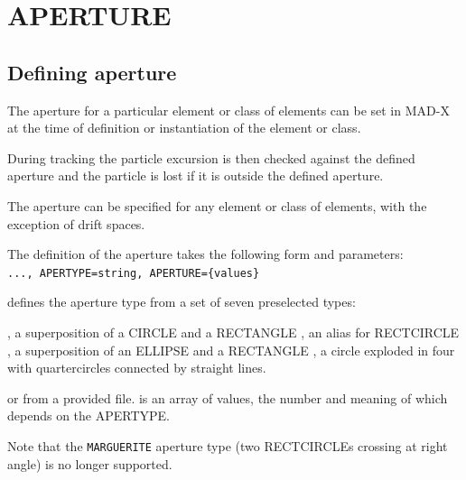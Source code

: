  
\chapter{APERTURE}
\label{chap:aperture}

\section{Defining aperture}
\label{sec:def_aper}
The aperture for a particular element or class of elements can be set in MAD-X 
at the time of definition or instantiation of the element or class.

During tracking the particle excursion is then checked against the defined aperture and 
the particle is lost if it is outside the defined aperture.

The aperture can be specified for any element or class of elements, 
with the exception of drift spaces. 

The definition of the aperture takes the following form and parameters:\\
{\tt ..., APERTYPE=string,  APERTURE=\{values\}}


\begin{madlist}
   defines the aperture type from a set of seven
  preselected types:
    \begin{madlist}
      , a superposition of a CIRCLE and
        a RECTANGLE 
      , an alias for RECTCIRCLE
      , a superposition of an ELLIPSE and a
        RECTANGLE
      , a circle exploded in four with
      quartercircles connected by straight lines.  
    \end{madlist}
    or from a provided file.
   is an array of values, the number and meaning 
of which depends on the APERTYPE.  
\end{madlist}
Note that the {\tt MARGUERITE} aperture type (two RECTCIRCLEs crossing
at right angle) is no longer supported. 

